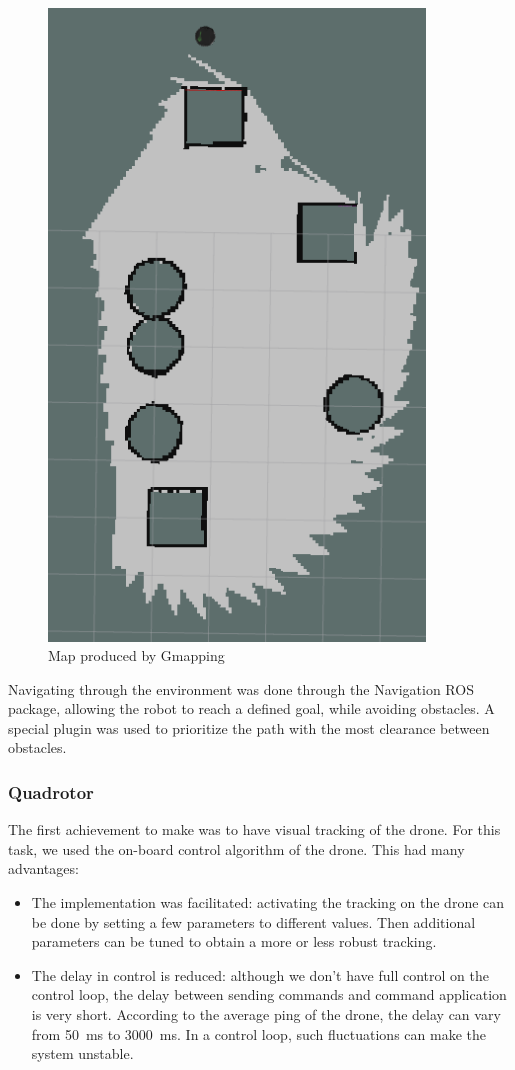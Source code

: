 \documentclass[11pt,a4paper]{article}
\begin{document}
\begin{figure}[ht]
	\centering
    \includegraphics[trim={0 0 0 2cm},clip,angle=270,width=10cm]{gmapping.png}
    \caption{Map produced by Gmapping}
    \label{fig:gmapping}
\end{figure}

Navigating through the environment was done through the Navigation ROS package, allowing the robot to reach a defined goal, while avoiding obstacles. A special plugin was used to prioritize the path with the most clearance between obstacles. 



\subsubsection{Quadrotor}
The first achievement to make was to have visual tracking of the drone. For this task, we used 
the on-board control algorithm of the drone. This had many advantages: 
\begin{itemize}
\item The implementation was facilitated: activating the tracking on the drone can be done by 
setting a few parameters to different values. Then additional parameters can be tuned to
obtain a more or less robust tracking.

\item The delay in control is reduced: although we don't have full control on the control
loop, the delay between sending commands and command application is very short. According to
the average ping of the drone, the delay can vary from 50~ms to 3000~ms. In a control loop,
such fluctuations can make the system unstable.
\end{itemize}
\end{document}

